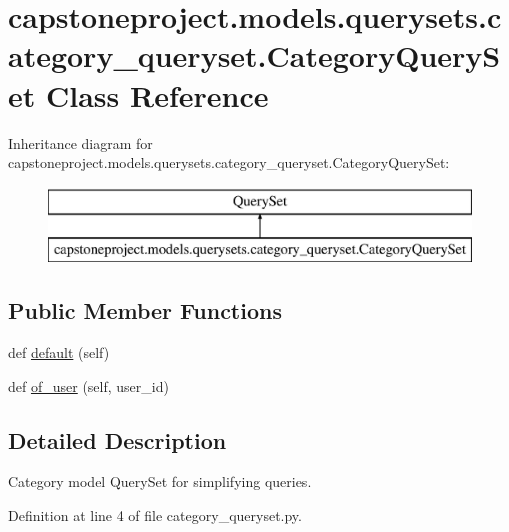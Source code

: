 \hypertarget{classcapstoneproject_1_1models_1_1querysets_1_1category__queryset_1_1_category_query_set}{}\section{capstoneproject.\+models.\+querysets.\+category\+\_\+queryset.\+Category\+Query\+Set Class Reference}
\label{classcapstoneproject_1_1models_1_1querysets_1_1category__queryset_1_1_category_query_set}
Inheritance diagram for capstoneproject.\+models.\+querysets.\+category\+\_\+queryset.\+Category\+Query\+Set\+:\begin{figure}[H]
\begin{center}
\leavevmode
\includegraphics[height=2.000000cm]{classcapstoneproject_1_1models_1_1querysets_1_1category__queryset_1_1_category_query_set}
\end{center}
\end{figure}
\subsection*{Public Member Functions}
\begin{DoxyCompactItemize}
\item 
def \mbox{\hyperlink{classcapstoneproject_1_1models_1_1querysets_1_1category__queryset_1_1_category_query_set_a24e806644d26eb8527880043e8ef48e6}{default}} (self)
\item 
def \mbox{\hyperlink{classcapstoneproject_1_1models_1_1querysets_1_1category__queryset_1_1_category_query_set_a5004a5735716808d4c1387d3dc859c50}{of\+\_\+user}} (self, user\+\_\+id)
\end{DoxyCompactItemize}


\subsection{Detailed Description}
\begin{DoxyVerb}Category model QuerySet for simplifying queries.\end{DoxyVerb}
 

Definition at line 4 of file category\+\_\+queryset.\+py.



